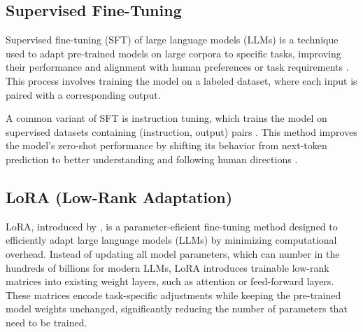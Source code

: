 \subsection{Supervised Fine-Tuning}

Supervised fine-tuning (SFT) of large language models (LLMs) is a technique used to adapt pre-trained models on large corpora to specific tasks, improving their performance and alignment with human preferences or task requirements \citep{Wang2023AligningLargeLanguageModels}. This process involves training the model on a labeled dataset, where each input is paired with a corresponding output.

A common variant of SFT is instruction tuning, which trains the model on supervised datasets containing (instruction, output) pairs \citep{Wei2022FinetunedLMZeroShot}. This method improves the model’s zero-shot performance by shifting its behavior from next-token prediction to better understanding and following human directions \citep{Zhang2024InstructionTuningLLM}. 




\subsection{LoRA (Low-Rank Adaptation)}     %


LoRA, introduced by \cite{Hu2021LoRA}, is a parameter-eficient fine-tuning method designed to efficiently adapt large language models (LLMs) by minimizing computational overhead. Instead of updating all model parameters, which can number in the hundreds of billions for modern LLMs, LoRA introduces trainable low-rank matrices into existing weight layers, such as attention or feed-forward layers. These matrices encode task-specific adjustments while keeping the pre-trained model weights unchanged, significantly reducing the number of parameters that need to be trained.

